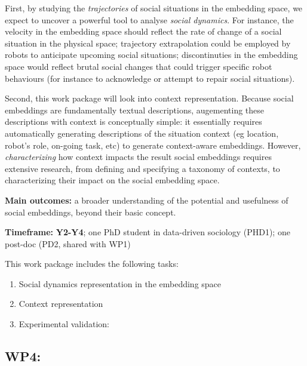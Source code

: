 First, by studying the \emph{trajectories} of social situations in the
embedding space, we expect to uncover a powerful tool to analyse \emph{social
dynamics}. For instance, the velocity in the embedding space should reflect the
rate of change of a social situation in the physical space; trajectory
extrapolation could be employed by robots to anticipate upcoming social
situations; discontinuties in the embedding space would reflect brutal social
changes that could trigger specific robot behaviours (for instance to
acknowledge or attempt to repair social situations).

Second, this work package will look into context representation. Because social
embeddings are fundamentally textual descriptions, augementing these
descriptions with context is conceptually simple: it essentially requires
automatically generating descriptions of the situation context (eg location,
robot's role, on-going task, etc) to generate context-aware embeddings. However,
\emph{characterizing} how context impacts the result social embeddings requires
extensive research, from defining and specifying a taxonomy of contexts, to
characterizing their impact on the social embedding space.

\begin{framed}

    \textbf{Main outcomes:} a broader understanding of the potential and
    usefulness of social embeddings, beyond their basic concept.

    \textbf{Timeframe:} \textbf{Y2-Y4}; one PhD student in data-driven sociology
    (PHD1); one post-doc (PD2, shared with WP1)

\end{framed}

This work package includes the following tasks:

\begin{enumerate}[label=\textbf{T1.\arabic*}]
    \item{Social dynamics representation in the embedding space}
    \item{Context representation}
    \item{Experimental validation: }
\end{enumerate}



\subsection{WP4: \textbf{\wpFour}}

